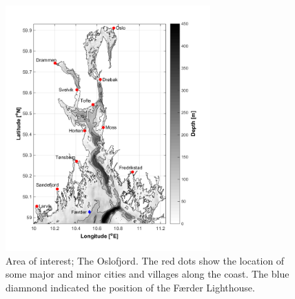 \begin{figure}[htb]
\centerline{
\includegraphics*[trim=0cm 0.8cm 0cm 0cm,clip=true,width=0.7\textwidth]{Figurer/kart}
}
\caption{\small
Area of interest; The Oslofjord. The red dots show the location of some major and minor cities and villages along the coast. The blue diamnond indicated the position of the F{\ae}rder Lighthouse.
}
\label{fig:kart}
\end{figure}

\newpage
